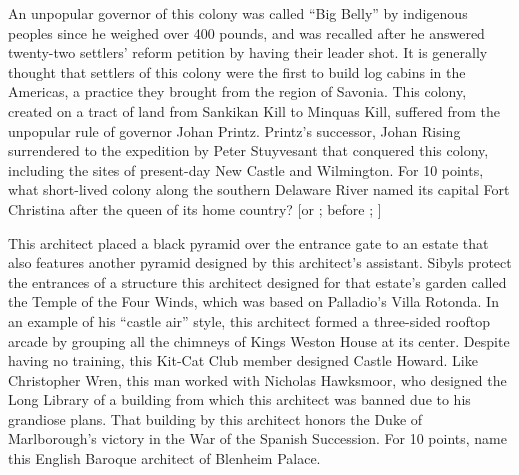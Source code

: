\documentclass[10pt]{article}
\begin{document}
\begin{tossup}
An unpopular governor of this colony was called “Big Belly” by indigenous peoples since he weighed over 400
pounds, and was recalled after he answered twenty-two settlers’ reform petition by having their leader shot. It is
generally thought that settlers of this colony were the first to build log cabins in the Americas, a practice they
brought from the region of \powmark Savonia. This colony, created on a tract of land from Sankikan Kill to Minquas Kill,
suffered from the unpopular rule of governor Johan Printz. Printz’s successor, Johan Rising 
surrendered to the expedition by Peter Stuyvesant  that conquered this colony, including the sites
of present-day New Castle and Wilmington. For 10 points, what short-lived colony along the southern Delaware
River named its capital Fort Christina after the queen of its home country?
[or  ;
 before ;
]
\end{tossup}


\begin{tossup}
This architect placed a black pyramid over the entrance gate to an estate that also features another pyramid
designed by this architect’s assistant. Sibyls protect the entrances of a structure this architect designed for that
estate’s garden called the Temple of the Four Winds, which was based on Palladio’s Villa Rotonda. In an example
of his “castle air” style, this architect formed a three-sided rooftop arcade by grouping all the chimneys of Kings
Weston House at its center. Despite having no training, this Kit-Cat Club member designed \powmark Castle Howard. Like
Christopher Wren, this man worked with Nicholas Hawksmoor, who designed the Long Library of a building from
which this architect was banned due to his grandiose plans. That building by this architect honors the Duke of
Marlborough’s victory in the War of the Spanish Succession. For 10 points, name this English Baroque architect of
Blenheim Palace.
\end{tossup}
\end{document}
